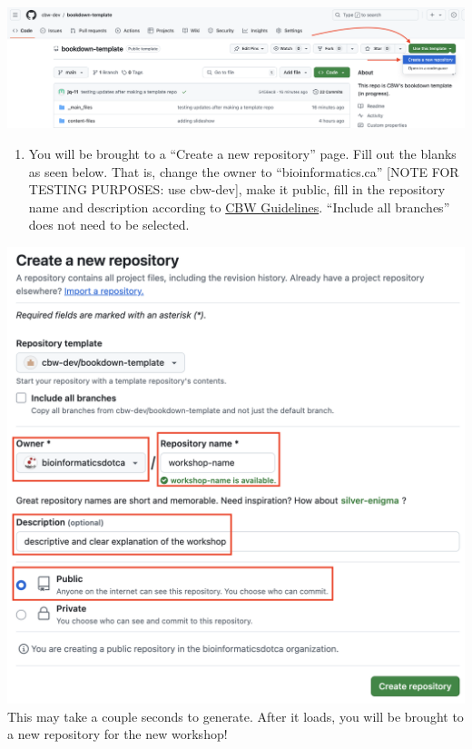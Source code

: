 \documentclass[
]{book}
\providecommand{\tightlist}{%
  \setlength{\itemsep}{0pt}\setlength{\parskip}{0pt}}
\theoremstyle{definition}
\theoremstyle{definition}
\theoremstyle{definition}
\theoremstyle{definition}
\theoremstyle{remark}
\begin{document}
\includegraphics{img/template/make-a-template.png}\\

\begin{enumerate}
\def\labelenumi{\arabic{enumi}.}
\setcounter{enumi}{2}
\tightlist
\item
  You will be brought to a ``Create a new repository'' page. Fill out the blanks as seen below. That is, change the owner to ``bioinformatics.ca'' {[}NOTE FOR TESTING PURPOSES: use cbw-dev{]}, make it public, fill in the repository name and description according to \href{}{CBW Guidelines}. ``Include all branches'' does not need to be selected.
\end{enumerate}

\includegraphics{img/template/make-new-repo.png}\\

This may take a couple seconds to generate. After it loads, you will be brought to a new repository for the new workshop!
\end{document}
